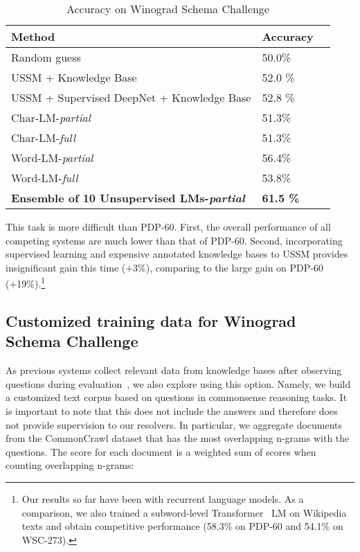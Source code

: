 \documentclass{article}
\begin{document}
\begin{table}[h!]
  \caption{Accuracy on Winograd Schema Challenge}
  \label{tab:winograd}
  \centering\small
  \small
  \begin{tabular}{llc}
    \toprule
    Method & Accuracy\\
    \midrule
    Random guess & 50.0\% \\
USSM + Knowledge Base & 52.0 \%\\
USSM + Supervised DeepNet + Knowledge Base & 52.8 \%\\
    \midrule
    Char-LM-\emph{partial} & 51.3\%\\
    Char-LM-\emph{full} & 51.3\%\\
    Word-LM-\emph{partial} & 56.4\%\\
    Word-LM-\emph{full} & 53.8\%\\
    \textbf{Ensemble of 10 Unsupervised LMs-\emph{partial}} & \textbf{61.5 \%}\\
    \bottomrule
  \end{tabular}
\end{table}

This task is more difficult than PDP-60. First, the overall performance of all competing systems are much lower than that of PDP-60. Second, incorporating supervised learning and expensive annotated knowledge bases to USSM provides insignificant gain this time (+3\%), comparing to the large gain on PDP-60 (+19\%).\footnote{Our results so far have been with recurrent language models. As a comparison, we also trained a subword-level Transformer~\cite{vaswani2017attention} LM on Wikipedia texts and obtain competitive performance (58.3\% on PDP-60 and 54.1\% on WSC-273).}

\subsection{Customized training data for Winograd Schema Challenge}\label{sec:stories}

As previous systems collect relevant data from knowledge bases after observing questions during evaluation~\cite{rahman2012resolving,sharma2015towards}, we also explore using this option. Namely, we build a customized text corpus based on questions in commonsense reasoning tasks. It is important to note that this does not include the answers and therefore does not provide supervision to our resolvers.  
In particular, we aggregate documents from the CommonCrawl dataset that has the most overlapping n-grams with the questions. The score for each document is a weighted sum of  scores when counting overlapping n-grams:
\end{document}
